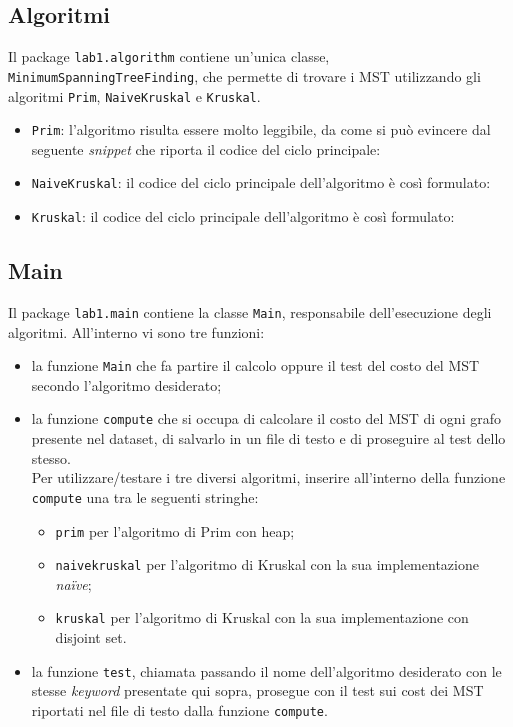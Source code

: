 \subsection{Algoritmi}
Il package \texttt{lab1.algorithm} contiene un'unica classe, \texttt{MinimumSpanningTreeFinding}, che permette di trovare i MST utilizzando gli algoritmi \texttt{Prim}, \texttt{NaiveKruskal} e \texttt{Kruskal}.
\begin{itemize}
	\item \texttt{Prim}: l'algoritmo risulta essere molto leggibile, da come si può evincere dal seguente \emph{snippet} che riporta il codice del ciclo principale:
	\item \texttt{NaiveKruskal}: il codice del ciclo principale dell'algoritmo è così formulato:
	\item \texttt{Kruskal}: il codice del ciclo principale dell'algoritmo è così formulato:
\end{itemize}

\subsection{Main}
Il package \texttt{lab1.main} contiene la classe \texttt{Main}, responsabile dell'esecuzione degli algoritmi. All'interno vi sono tre funzioni:
\begin{itemize}
	\item la funzione \texttt{Main} che fa partire il calcolo oppure il test del costo del MST secondo l'algoritmo desiderato;
	\item la funzione \texttt{compute} che si occupa di calcolare il costo del MST di ogni grafo presente nel dataset, di salvarlo in un file di testo e di proseguire al test dello stesso.\\
	Per utilizzare/testare i tre diversi algoritmi, inserire all'interno della funzione \texttt{compute} una tra le seguenti stringhe:
	\begin{itemize}
		\item \texttt{prim} per l'algoritmo di Prim con heap;
		\item \texttt{naivekruskal} per l'algoritmo di Kruskal con la sua implementazione \emph{na\"ive};
		\item \texttt{kruskal} per l'algoritmo di Kruskal con la sua implementazione con disjoint set.
	\end{itemize}
    \item la funzione \texttt{test}, chiamata passando il nome dell'algoritmo desiderato con le stesse \emph{keyword} presentate qui sopra, prosegue con il test sui cost dei MST riportati nel file di testo dalla funzione \texttt{compute}.
\end{itemize}

